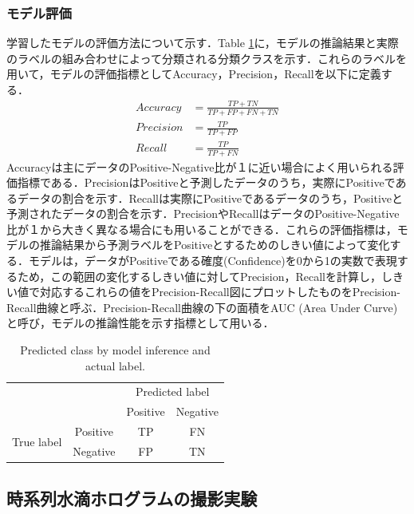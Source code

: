 \subsubsection{モデル評価}\label{sec:modelEvaluation}
学習したモデルの評価方法について示す．Table \ref{table:evalclass}に，モデルの推論結果と実際のラベルの組み合わせによって分類される分類クラスを示す．これらのラベルを用いて，モデルの評価指標としてAccuracy，Precision，Recallを以下に定義する．
\begin{align}
    Accuracy &= \frac{TP + TN}{TP + FP + FN + TN} \\
    Precision &= \frac{TP}{TP + FP} \\
    Recall &= \frac{TP}{TP + FN}
\end{align}
Accuracyは主にデータのPositive-Negative比が１に近い場合によく用いられる評価指標である．PrecisionはPositiveと予測したデータのうち，実際にPositiveであるデータの割合を示す．Recallは実際にPositiveであるデータのうち，Positiveと予測されたデータの割合を示す．PrecisionやRecallはデータのPositive-Negative比が１から大きく異なる場合にも用いることができる．これらの評価指標は，モデルの推論結果から予測ラベルをPositiveとするためのしきい値によって変化する．モデルは，データがPositiveである確度(Confidence)を0から1の実数で表現するため，この範囲の変化するしきい値に対してPrecision，Recallを計算し，しきい値で対応するこれらの値をPrecision-Recall図にプロットしたものをPrecision-Recall曲線と呼ぶ．Precision-Recall曲線の下の面積をAUC (Area Under Curve)と呼び，モデルの推論性能を示す指標として用いる\cite{saito2015}．
\begin{table}[H]
    \centering
    \caption{Predicted class by model inference and actual label.}
    \begin{tabular}{c|c | cc}
        \multicolumn{2}{l|}{\multirow{2}{*}{}}  & \multicolumn{2}{c}{Predicted label} \\ \cline{3-4}
        \multicolumn{2}{l|}{}                   & Positive         & Negative         \\ \hline 
        \multirow{2}{*}{True label} & Positive & TP               & FN               \\ \cline{2-4}
                                    & Negative & FP               & TN              
        \end{tabular}
    \label{table:evalclass}
\end{table}


\subsection{時系列水滴ホログラムの撮影実験}
